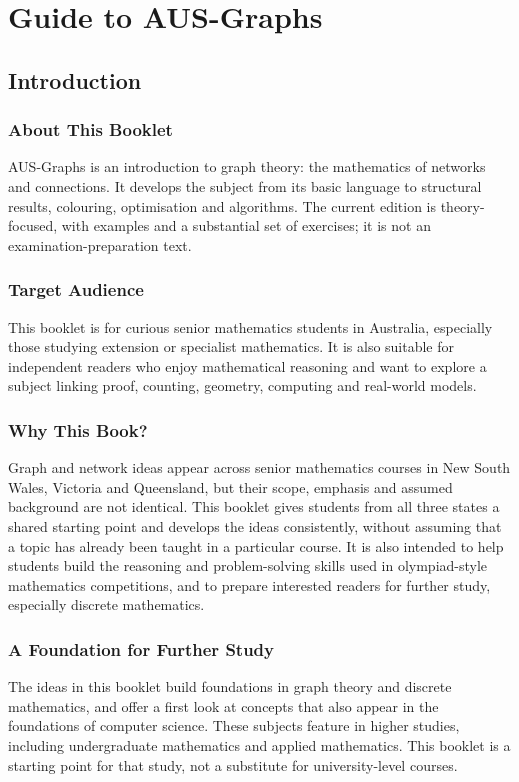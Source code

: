 \chapter*{Guide to AUS-Graphs}
\section*{Introduction}

\subsection*{About This Booklet}
AUS-Graphs is an introduction to graph theory: the mathematics of networks and connections. It develops the subject from its basic language to structural results, colouring, optimisation and algorithms. The current edition is theory-focused, with examples and a substantial set of exercises; it is not an examination-preparation text.

\subsection*{Target Audience}
This booklet is for curious senior mathematics students in Australia, especially those studying extension or specialist mathematics. It is also suitable for independent readers who enjoy mathematical reasoning and want to explore a subject linking proof, counting, geometry, computing and real-world models.

\subsection*{Why This Book?}
Graph and network ideas appear across senior mathematics courses in New South Wales, Victoria and Queensland, but their scope, emphasis and assumed background are not identical. This booklet gives students from all three states a shared starting point and develops the ideas consistently, without assuming that a topic has already been taught in a particular course. It is also intended to help students build the reasoning and problem-solving skills used in olympiad-style mathematics competitions, and to prepare interested readers for further study, especially discrete mathematics.

\subsection*{A Foundation for Further Study}
The ideas in this booklet build foundations in graph theory and discrete mathematics, and offer a first look at concepts that also appear in the foundations of computer science. These subjects feature in higher studies, including undergraduate mathematics and applied mathematics. This booklet is a starting point for that study, not a substitute for university-level courses.

